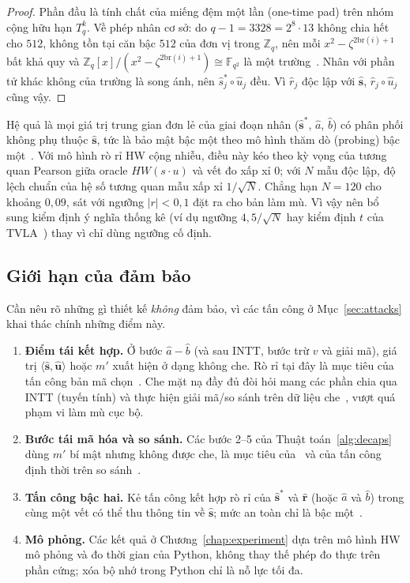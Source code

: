 \documentclass[../LuanVan.tex]{subfiles}
\begin{document}
\begin{proof}
Phần đầu là tính chất của miếng đệm một lần (one-time pad) trên nhóm cộng hữu hạn $T_q^k$. Về phép nhân cơ sở: do $q-1=3328=2^8\cdot13$ không chia hết cho $512$, không tồn tại căn bậc $512$ của đơn vị trong $\mathbb{Z}_q$, nên mỗi $x^2-\zeta^{2\mathrm{br}(i)+1}$ bất khả quy và $\mathbb{Z}_q[x]/(x^2-\zeta^{2\mathrm{br}(i)+1})\cong\mathbb{F}_{q^2}$ là một trường~\cite{Avanzi21}. Nhân với phần tử khác không của trường là song ánh, nên $\hat{s}^{*}_j\circ\hat{u}_j$ đều. Vì $\hat{r}_j$ độc lập với $\hat{\mathbf{s}}$, $\hat{r}_j\circ\hat{u}_j$ cũng vậy.
\end{proof}
 
Hệ quả là mọi giá trị trung gian đơn lẻ của giai đoạn nhân ($\hat{\mathbf{s}}^{*}$, $\hat{a}$, $\hat{b}$) có phân phối không phụ thuộc $\hat{\mathbf{s}}$, tức là bảo mật bậc một theo mô hình thăm dò (probing) bậc một~\cite{ISW03}. Với mô hình rò rỉ HW cộng nhiễu, điều này kéo theo kỳ vọng của tương quan Pearson giữa oracle $HW(s\cdot u)$ và vết đo xấp xỉ $0$; với $N$ mẫu độc lập, độ lệch chuẩn của hệ số tương quan mẫu xấp xỉ $1/\sqrt{N}$. Chẳng hạn $N=120$ cho khoảng $0{,}09$, sát với ngưỡng $|r|<0{,}1$ đặt ra cho bản làm mù. Vì vậy nên bổ sung kiểm định ý nghĩa thống kê (ví dụ ngưỡng $4{,}5/\sqrt{N}$ hay kiểm định $t$ của TVLA~\cite{GoodwillJJR11,SchneiderMoradi15}) thay vì chỉ dùng ngưỡng cố định.
 
\subsection{Giới hạn của đảm bảo}
 
Cần nêu rõ những gì thiết kế \emph{không} đảm bảo, vì các tấn công ở Mục~\ref{sec:attacks} khai thác chính những điểm này.
 
\begin{enumerate}
\item \textbf{Điểm tái kết hợp.} Ở bước $\hat{a}-\hat{b}$ (và sau $\mathrm{INTT}$, bước trừ $v$ và giải mã), giá trị $\langle\hat{\mathbf{s}},\hat{\mathbf{u}}\rangle$ hoặc $m'$ xuất hiện ở dạng không che. Rò rỉ tại đây là mục tiêu của tấn công bản mã chọn~\cite{Ravi20,Hamburg21}. Che mặt nạ đầy đủ đòi hỏi mang các phần chia qua INTT (tuyến tính) và thực hiện giải mã/so sánh trên dữ liệu che~\cite{Bos21}, vượt quá phạm vi làm mù cục bộ.
\item \textbf{Bước tái mã hóa và so sánh.} Các bước 2--5 của Thuật toán~\ref{alg:decaps} dùng $m'$ bí mật nhưng không được che, là mục tiêu của~\cite{Ueno22} và của tấn công định thời trên so sánh~\cite{guo2020}.
\item \textbf{Tấn công bậc hai.} Kẻ tấn công kết hợp rò rỉ của $\hat{\mathbf{s}}^{*}$ và $\hat{\mathbf{r}}$ (hoặc $\hat{a}$ và $\hat{b}$) trong cùng một vết có thể thu thông tin về $\hat{\mathbf{s}}$; mức an toàn chỉ là bậc một~\cite{ChariJRR99,ISW03}.
\item \textbf{Mô phỏng.} Các kết quả ở Chương~\ref{chap:experiment} dựa trên mô hình HW mô phỏng và đo thời gian của Python, không thay thế phép đo thực trên phần cứng; xóa bộ nhớ trong Python chỉ là nỗ lực tối đa.
\end{enumerate}
 
\end{document}
